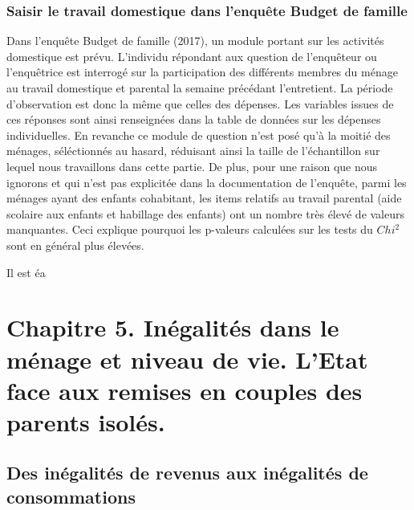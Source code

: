 \documentclass[
  12pt,
]{book}
\begin{document}
\subsection{Saisir le travail domestique dans l'enquête Budget de
famille}\label{saisir-le-travail-domestique-dans-lenquuxeate-budget-de-famille}

Dans l'enquête Budget de famille (2017), un module portant sur les
activités domestique est prévu. L'individu répondant aux question de
l'enquêteur ou l'enquêtrice est interrogé sur la participation des
différents membres du ménage au travail domestique et parental la
semaine précédant l'entretient. La période d'observation est donc la
même que celles des dépenses. Les variables issues de ces réponses sont
ainsi renseignées dans la table de données sur les dépenses
individuelles. En revanche ce module de question n'est posé qu'à la
moitié des ménages, séléctionnés au hasard, réduisant ainsi la taille de
l'échantillon sur lequel nous travaillons dans cette partie. De plus,
pour une raison que nous ignorons et qui n'est pas explicitée dans la
documentation de l'enquête, parmi les ménages ayant des enfants
cohabitant, les items relatifs au travail parental (aide scolaire aux
enfants et habillage des enfants) ont un nombre très élevé de valeurs
manquantes. Ceci explique pourquoi les p-valeurs calculées sur les tests
du \(Chi^2\) sont en général plus élevées.

Il est éa

\chapter{Chapitre 5. Inégalités dans le ménage et niveau de vie. L'Etat
face aux remises en couples des parents
isolés.}\label{chapitre-5.-inuxe9galituxe9s-dans-le-muxe9nage-et-niveau-de-vie.-letat-face-aux-remises-en-couples-des-parents-isoluxe9s.}

\section{Des inégalités de revenus aux inégalités de
consommations}\label{des-inuxe9galituxe9s-de-revenus-aux-inuxe9galituxe9s-de-consommations}
\end{document}
